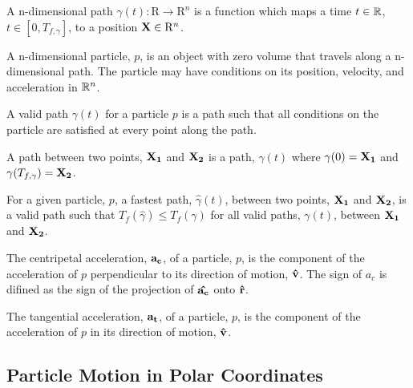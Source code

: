 \begin{definition}
A n-dimensional path $\gamma(t): \mathrm{R} \to \mathrm{R}^n$ is a function which maps a time $t \in \mathbb R$, $t \in [0, T_{f, \gamma}]$, to a position $\mathbf{X} \in \mathrm{R}^n$. 
\end{definition}

\begin{definition}
  A n-dimensional particle, $p$, is an object with zero volume that travels along a n-dimensional path. The particle may have conditions on its position, velocity, and acceleration in $\mathbb R^n$.
\end{definition}

\begin{definition}
  A valid path $\gamma(t)$ for a particle $p$ is a path such that all conditions on the particle are satisfied at every point along the path.
\end{definition}

\begin{definition}
  A path between two points, $\mathbf{X_1}$ and $\mathbf{X_2}$ is a path, $\gamma(t)$ where $\gamma(0) = \mathbf{X_1}$ and $\gamma(T_{f, \gamma}) = \mathbf{X_2}$.
\end{definition}

\begin{definition}
  For a given particle, $p$, a fastest path, $\hat{\gamma}(t)$, between two points, $\mathbf{X_1}$ and $\mathbf{X_2}$, is a valid path such that $T_f(\hat{\gamma}) \leq T_f(\gamma)$ for all valid paths, $\gamma(t)$, between $\mathbf{X_1}$ and $\mathbf{X_2}$.
\end{definition}

\begin{definition}
  The centripetal acceleration, $\mathbf{a_c}$, of a particle, $p$, is the component of the acceleration of $p$ perpendicular to its direction of motion, $\mathbf{\hat{v}}$. The sign of $a_c$ is difined as the sign of the projection of $\mathbf{\hat{a_c}}$ onto $\mathbf{\hat{r}}$.
\end{definition}

\begin{definition}
  The tangential acceleration, $\mathbf{a_t}$, of a particle, $p$, is the component of the acceleration of $p$ in its direction of motion, $\mathbf{\hat{v}}$.
\end{definition}


\subsection{Particle Motion in Polar Coordinates}

